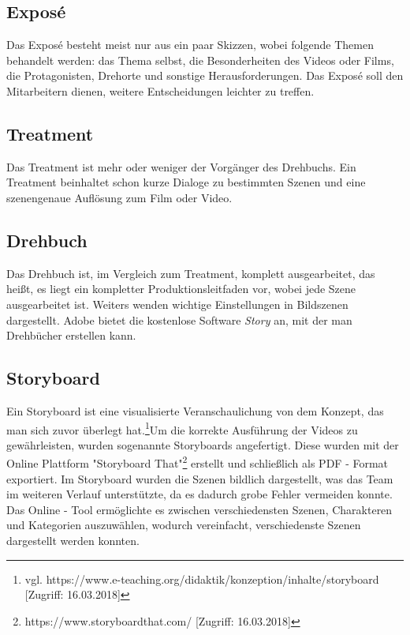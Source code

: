 \subsection{Expos\'{e}}
Das Expos\'{e} besteht meist nur aus ein paar Skizzen, wobei folgende Themen behandelt werden: das Thema selbst, die Besonderheiten des Videos oder Films, die Protagonisten, Drehorte und sonstige Herausforderungen. Das Expos\'{e} soll den Mitarbeitern dienen, weitere Entscheidungen leichter zu treffen.
\subsection{Treatment}
Das Treatment ist mehr oder weniger der Vorgänger des Drehbuchs. Ein Treatment beinhaltet schon kurze Dialoge zu bestimmten Szenen und eine szenengenaue Auflösung zum Film oder Video.
\subsection{Drehbuch}
Das Drehbuch ist, im Vergleich zum Treatment, komplett ausgearbeitet, das heißt, es liegt ein kompletter Produktionsleitfaden vor, wobei jede Szene ausgearbeitet ist. Weiters wenden wichtige Einstellungen in Bildszenen dargestellt. Adobe bietet die kostenlose Software \textit{Story} an, mit der man Drehbücher erstellen kann. 
\subsection{Storyboard}
Ein Storyboard ist eine visualisierte Veranschaulichung von dem Konzept, das man sich zuvor überlegt hat.\footnote{\label{}vgl. https://www.e-teaching.org/didaktik/konzeption/inhalte/storyboard [Zugriff: 16.03.2018]}Um die korrekte Ausführung der Videos zu gewährleisten, wurden sogenannte Storyboards angefertigt. Diese wurden mit der Online Plattform "Storyboard That"\footnote{\label{}https://www.storyboardthat.com/ [Zugriff: 16.03.2018]} erstellt und schließlich als PDF - Format exportiert.
Im Storyboard wurden die Szenen bildlich dargestellt, was das Team im weiteren Verlauf unterstützte, da es dadurch grobe Fehler vermeiden konnte.
Das Online - Tool ermöglichte es zwischen verschiedensten Szenen, Charakteren und Kategorien auszuwählen, wodurch vereinfacht, verschiedenste Szenen dargestellt werden konnten. 
